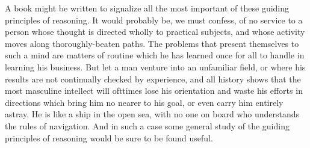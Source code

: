A book might be written to signalize all the most important of these
guiding principles of reasoning. It would probably be, we must
confess, of no service to a person whose thought is directed wholly to
practical subjects, and whose activity moves along thoroughly-beaten
paths. The problems that present themselves to such a mind are matters
of routine which he has learned once for all to handle in learning his
business. But let a man venture into an unfamiliar field, or where his
results are not continually checked by experience, and all history
shows that the most masculine intellect will ofttimes lose his
orientation and waste his efforts in directions which bring him no
nearer to his goal, or even carry him entirely astray. He is like a
ship in the open sea, with no one on board who understands the rules
of navigation. And in such a case some general study of the guiding
principles of reasoning would be sure to be found useful.

